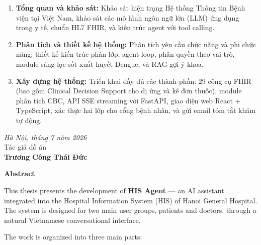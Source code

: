 \documentclass[a4paper,13pt,3p,twoside,openany]{report}
\theoremstyle{definition}
\theoremstyle{remark}
\theoremstyle{definition}
\begin{document}
\begin{enumerate}
\item \textbf{Tổng quan và khảo sát:} Khảo sát hiện trạng Hệ thống Thông tin Bệnh viện tại Việt Nam, khảo sát các mô hình ngôn ngữ lớn (LLM) ứng dụng trong y tế, chuẩn HL7 FHIR, và kiến trúc agent với tool calling.

\item \textbf{Phân tích và thiết kế hệ thống:} Phân tích yêu cầu chức năng và phi chức năng; thiết kế kiến trúc phân lớp, agent loop, phân quyền theo vai trò, module sàng lọc sốt xuất huyết Dengue, và RAG gợi ý khoa.

\item \textbf{Xây dựng hệ thống:} Triển khai đầy đủ các thành phần: 29 công cụ FHIR (bao gồm Clinical Decision Support cho dị ứng và kê đơn thuốc), module phân tích CBC, API SSE streaming với FastAPI, giao diện web React + TypeScript, xác thực hai lớp cho cổng bệnh nhân, và gửi email tóm tắt khám tự động.
\end{enumerate}

\hspace{0.5\textwidth}
\begin{minipage}{0.5\textwidth}
	\noindent\begin{center}
		\vspace{1cm}
		\textit{Hà Nội, tháng 7 năm 2026} \\
		Tác giả đồ án\\ \vspace{2cm}
		\textbf{Trương Công Thái Đức}
	\end{center}
\end{minipage}

\newpage
{}
\fontsize{22pt}{16pt}\selectfont
{\bfseries Abstract}
\fontsize{13pt}{16pt}\selectfont
\bigskip
\bigskip

This thesis presents the development of \textbf{HIS Agent} --- an AI assistant integrated into the Hospital Information System (HIS) of Hanoi General Hospital. The system is designed for two main user groups, patients and doctors, through a natural Vietnamese conversational interface.

The work is organized into three main parts:
\end{document}
